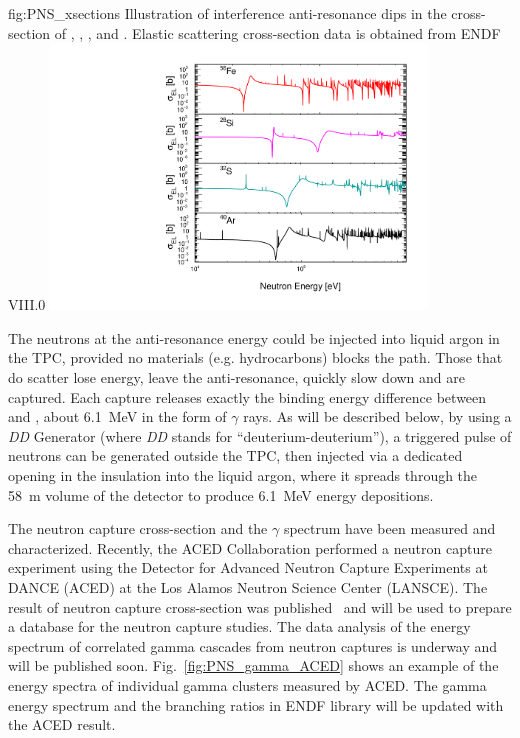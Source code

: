 \begin{dunefigure}{fig:PNS_xsections}
{Illustration of interference anti-resonance dips in the cross-section of , , , and . Elastic scattering cross-section data is obtained from ENDF VIII.0}
\includegraphics[width=10cm]{graphics/PNS_xsection.pdf}
\end{dunefigure}

The neutrons at the anti-resonance energy could be injected into liquid argon in the TPC, provided no materials (e.g. hydrocarbons) blocks the path. Those that do scatter lose energy, leave the anti-resonance, quickly slow down and are captured. Each capture releases exactly the binding energy difference between  and , about \SI{6.1}{\MeV} in the form of $\gamma$ rays.  As will be described below, by using a {\it DD} Generator (where {\it DD} stands for ``deuterium-deuterium''), a triggered pulse of neutrons can be generated outside the TPC, then injected via a dedicated opening in the insulation into the liquid argon, where it spreads through the \SI{58}{\m} volume of the detector to produce \SI{6.1}{\MeV} energy depositions.

The neutron capture cross-section and the $\gamma$ spectrum have been measured and characterized. Recently, the ACED Collaboration performed a neutron capture experiment using  the Detector  for Advanced  Neutron  Capture  Experiments  at DANCE (ACED)  at the  Los  Alamos  Neutron  Science  Center  (LANSCE). The result of neutron capture cross-section was published~\cite{Fischer:2019qfr} and will be used to prepare a database for the neutron capture studies. The data analysis of the energy spectrum of correlated gamma cascades from neutron captures is underway and will be published soon. Fig.~\ref{fig:PNS_gamma_ACED} shows an example of the energy spectra of individual gamma clusters measured by ACED. The gamma energy spectrum and the branching ratios in ENDF library will be updated with the ACED result. 

